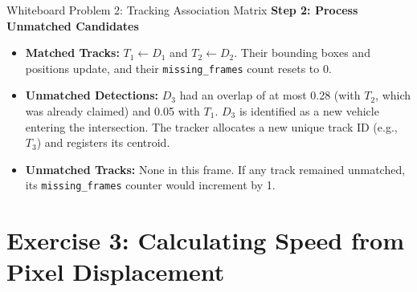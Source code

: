 \documentclass[11pt,a4paper,oneside]{report}
\begin{document}
\begin{interviewq}{Whiteboard Problem 2: Tracking Association Matrix}
\textbf{Step 2: Process Unmatched Candidates}
\begin{itemize}
    \item \textbf{Matched Tracks:} $T_1 \leftarrow D_1$ and $T_2 \leftarrow D_2$. Their bounding boxes and positions update, and their \texttt{missing\_frames} count resets to 0.
    \item \textbf{Unmatched Detections:} $D_3$ had an overlap of at most 0.28 (with $T_2$, which was already claimed) and 0.05 with $T_1$. $D_3$ is identified as a new vehicle entering the intersection. The tracker allocates a new unique track ID (e.g., $T_3$) and registers its centroid.
    \item \textbf{Unmatched Tracks:} None in this frame. If any track remained unmatched, its \texttt{missing\_frames} counter would increment by 1.
\end{itemize}
\end{interviewq}

\section{Exercise 3: Calculating Speed from Pixel Displacement}
\label{sec:wb_speed}
\end{document}
